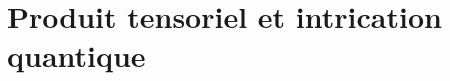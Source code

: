 \documentclass[../notesdecours.tex]{subfiles}
\begin{document}
\part{Produit tensoriel et intrication quantique}
\end{document}
